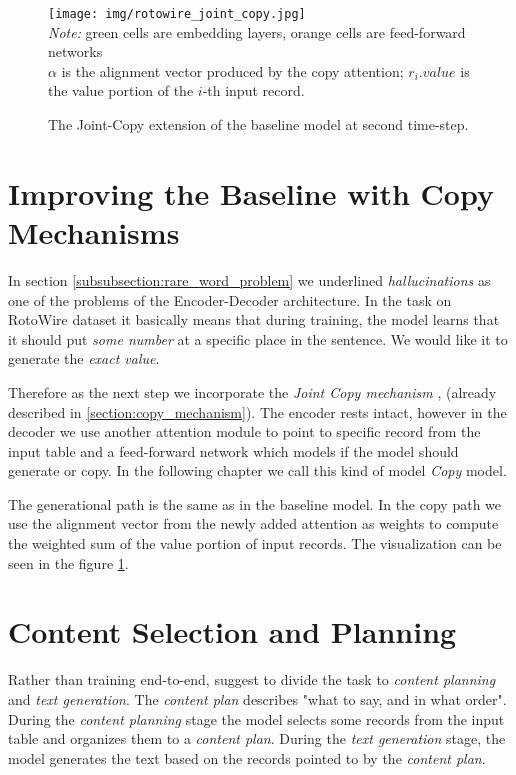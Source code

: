 \begin{figure}[!h]
    \centering
    \texttt{[image: img/rotowire\_joint\_copy.jpg]}
    \footnotesize{\\ \textit{Note:} green cells are embedding layers, orange cells are feed-forward networks \\ $\alpha$ is the alignment vector produced by the copy attention; $r_i.value$ is the value portion of the $i$-th input record.}
    \caption{\centering The Joint-Copy extension of the baseline model at second time-step.} \label{rotowire_joint_copy_vis}
\end{figure}

\section{Improving the Baseline with Copy Mechanisms} \label{section:copy_mechanism_intro}

In section \ref{subsubsection:rare_word_problem} we underlined \emph{hallucinations} as one of the problems of the Encoder-Decoder architecture. In the task on RotoWire dataset it basically means that during training, the model learns that it should put \emph{some number} at a specific place in the sentence. We would like it to generate the \emph{exact value}.

Therefore as the next step we incorporate the \emph{Joint Copy mechanism} \citep{gu2016incorporating}, \citep{yang2016referenceaware} (already described in \ref{section:copy_mechanism}). The encoder rests intact, however in the decoder we use another attention module to point to specific record from the input table and a feed-forward network which models if the model should generate or copy. In the following chapter we call this kind of model \emph{Copy} model.

The generational path is the same as in the baseline model. In the copy path we use the alignment vector from the newly added attention as weights to compute the weighted sum of the value portion of input records. The visualization can be seen in the figure \ref{rotowire_joint_copy_vis}.

\section{Content Selection and Planning} \label{section:content_selection_and_planning}

Rather than training end-to-end, \citep{puduppully2019datatotext} suggest to divide the task to \emph{content planning} and \emph{text generation}. The \emph{content plan} describes "what to say, and in what order". During the \emph{content planning} stage the model selects some records from the input table and organizes them to a \emph{content plan}. During the \emph{text generation} stage, the model generates the text based on the records pointed to by the \emph{content plan}.

